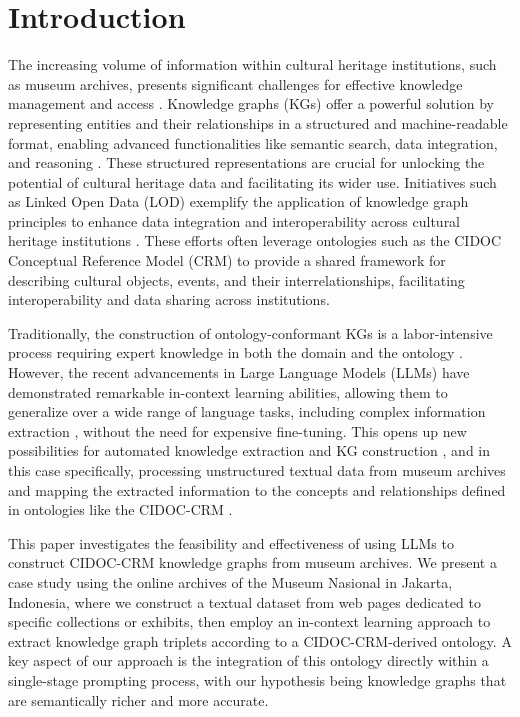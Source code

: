 \documentclass[a4, conference]{IEEEtran}
\begin{document}
\section{Introduction}
\label{sec:introduction}

The increasing volume of information within cultural heritage institutions, such as museum archives, presents significant challenges for effective knowledge management and access \cite{alexiev2018museum}. Knowledge graphs (KGs) offer a powerful solution by representing entities and their relationships in a structured and machine-readable format, enabling advanced functionalities like semantic search, data integration, and reasoning \cite{hofer2024constructionofknowledge}. These structured representations are crucial for unlocking the potential of cultural heritage data and facilitating its wider use. Initiatives such as Linked Open Data (LOD) exemplify the application of knowledge graph principles to enhance data integration and interoperability across cultural heritage institutions \cite{pedro2013connectingthesmithsonian,dutia2021heritageconnector}. These efforts often leverage ontologies such as the CIDOC Conceptual Reference Model \cite{doerr2005thecidoc} (CRM) to provide a shared framework for describing cultural objects, events, and their interrelationships, facilitating interoperability and data sharing across institutions.

Traditionally, the construction of ontology-conformant KGs is a labor-intensive process requiring expert knowledge in both the domain and the ontology \cite{hofer2024constructionofknowledge}. However, the recent advancements in Large Language Models (LLMs) have demonstrated remarkable in-context learning abilities, allowing them to generalize over a wide range of language tasks, including complex information extraction \cite{remadi2024topromptornottoprompt}, without the need for expensive fine-tuning. This opens up new possibilities for automated knowledge extraction and KG construction \cite{ibrahim2024asurveyonaugmentingknowledgegraphs,zhu2024llmsknowledgegraphconstruction}, and in this case specifically, processing unstructured textual data from museum archives and mapping the extracted information to the concepts and relationships defined in ontologies like the CIDOC-CRM \cite{bruseker2017culturalheritagedatamanagement}.

This paper investigates the feasibility and effectiveness of using LLMs to construct CIDOC-CRM knowledge graphs from museum archives. We present a case study using the online archives of the Museum Nasional in Jakarta, Indonesia, where we construct a textual dataset from web pages dedicated to specific collections or exhibits, then employ an in-context learning approach to extract knowledge graph triplets according to a CIDOC-CRM-derived ontology. A key aspect of our approach is the integration of this ontology directly within a single-stage prompting process, with our hypothesis being knowledge graphs that are semantically richer and more accurate.
\end{document}

